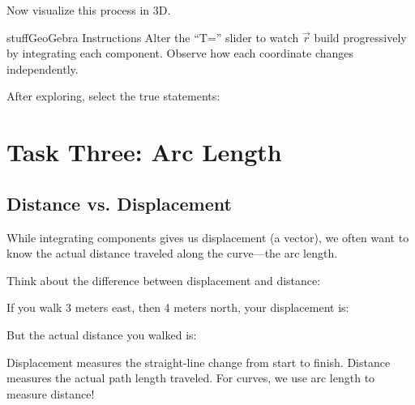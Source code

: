 \documentclass{ximera}
\begin{document}
\begin{problem}
Now visualize this process in 3D.

\begin{expandable}{stuff}{GeoGebra Instructions}
    Alter the ``T='' slider to watch $\vec{r}$ build progressively by integrating each component. Observe how each coordinate changes independently.
\end{expandable}

\begin{center}
\end{center}

After exploring, select the true statements:
\begin{selectAll}
\end{selectAll}
\end{problem}

\section*{Task Three: Arc Length}

\subsection*{Distance vs. Displacement}

While integrating components gives us displacement (a vector), we often want to know the actual distance traveled along the curve—the arc length.

\begin{problem}
Think about the difference between displacement and distance:

If you walk 3 meters east, then 4 meters north, your displacement is:
\begin{multipleChoice}
\end{multipleChoice}

But the actual distance you walked is:
\begin{multipleChoice}
\end{multipleChoice}

\begin{feedback}
Displacement measures the straight-line change from start to finish. Distance measures the actual path length traveled. For curves, we use arc length to measure distance!
\end{feedback}
\end{problem}
\end{document}
